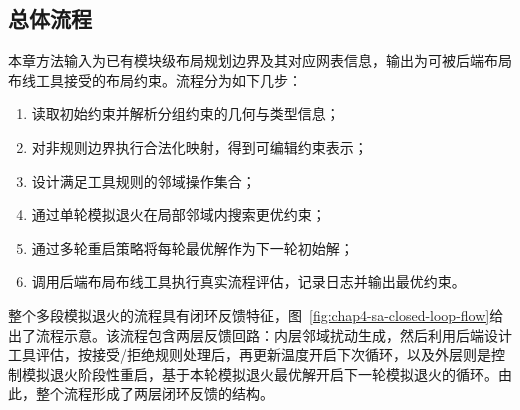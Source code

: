 \subsection{总体流程}
\label{sec:chap4-overall-flow}

本章方法输入为已有模块级布局规划边界及其对应网表信息，输出为可被后端布局布线工具接受的布局约束。流程分为如下几步：
\begin{enumerate}
    \item 读取初始约束并解析分组约束的几何与类型信息；
    \item 对非规则边界执行合法化映射，得到可编辑约束表示；
    \item 设计满足工具规则的邻域操作集合；
    \item 通过单轮模拟退火在局部邻域内搜索更优约束；
    \item 通过多轮重启策略将每轮最优解作为下一轮初始解；
    \item 调用后端布局布线工具执行真实流程评估，记录日志并输出最优约束。
\end{enumerate}

整个多段模拟退火的流程具有闭环反馈特征，图~\ref{fig:chap4-sa-closed-loop-flow}给出了流程示意。该流程包含两层反馈回路：内层邻域扰动生成，然后利用后端设计工具评估，按接受/拒绝规则处理后，再更新温度开启下次循环，以及外层则是控制模拟退火阶段性重启，基于本轮模拟退火最优解开启下一轮模拟退火的循环。由此，整个流程形成了两层闭环反馈的结构。

